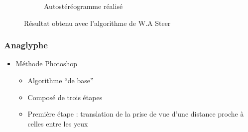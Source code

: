 \documentclass{beamer}
\begin{document}
\begin{frame}
\begin{figure}
\begin{subfigure}{.4\textwidth}
  \caption{Autostéréogramme réalisé}
\end{subfigure}
\caption{Résultat obtenu avec l'algorithme de W.A Steer}
\end{figure}

\end{frame}

%

\begin{frame}
\frametitle{Anaglyphe}
\begin{itemize}[label=$\bullet$]
\item Méthode Photoshop \cite{stereoAnaglyph}
	\begin{itemize}[label=$\circ$]
	\item Algorithme ``de base''
	\item Composé de trois étapes 
	\item Première étape : translation de la prise de vue d'une distance proche à celles entre les yeux 
	\end{itemize}
\end{itemize}


\end{frame}
\end{document}
